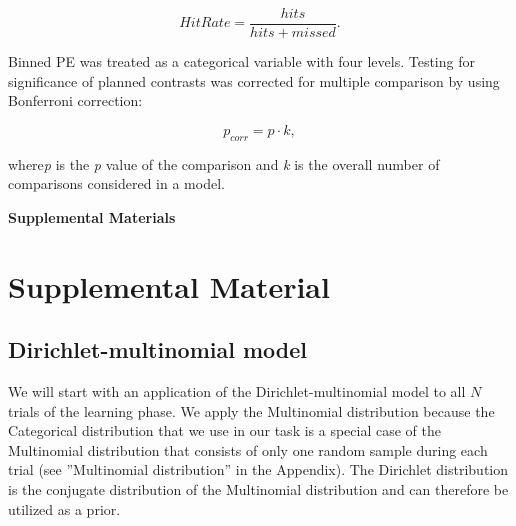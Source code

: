 \documentclass[a4paper,12pt]{article}
\begin{document}
\begin{equation}
Hit Rate =   \dfrac{hits}{hits+missed}.
\end{equation}

\noindent
Binned PE was treated as a categorical variable with four levels. Testing for significance of planned contrasts was corrected for multiple comparison by using Bonferroni correction:

\begin{equation}
p_{corr} =   p \cdot k, 
\end{equation}

\noindent
where\textit{p} is the \textit{p} value of the comparison and \textit{k} is the overall number of comparisons considered in a model. 





 

\pagebreak
\begin{center}
\textbf{\large Supplemental Materials}
\end{center}
\setcounter{equation}{0}
\setcounter{figure}{0}
\setcounter{table}{0}
\setcounter{page}{1}
\makeatletter
\renewcommand{\theequation}{S\arabic{equation}}
\renewcommand{\thefigure}{S\arabic{figure}}
\renewcommand{\bibnumfmt}[1]{[S#1]}
\renewcommand{\citenumfont}[1]{S#1}

\section{Supplemental Material}
\subsection*{Dirichlet-multinomial model}
We will start with an application of the Dirichlet-multinomial model to all $N$ trials of the learning phase. We apply the Multinomial distribution because the Categorical distribution that we use in our task is a special case of the Multinomial distribution that consists of only one random sample during each trial (see ''Multinomial distribution'' in the Appendix). The Dirichlet distribution is the conjugate distribution of the Multinomial distribution and can therefore be utilized as a prior. 
\end{document}
